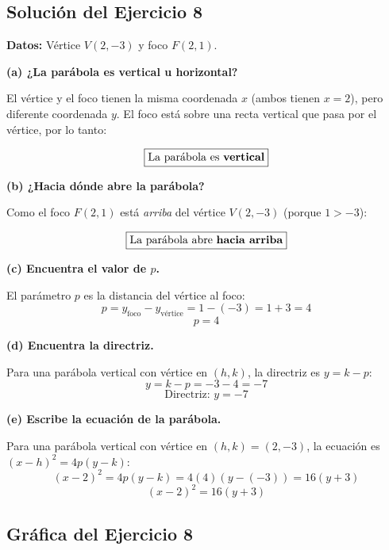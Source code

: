 \documentclass[12pt,a4paper]{article}
\begin{document}
	\newpage

	\subsection*{Solución del Ejercicio 8}

	\textbf{Datos:} Vértice \(V(2,-3)\) y foco \(F(2,1)\).

	\bigskip

	\textbf{(a) ¿La parábola es vertical u horizontal?}

	El vértice y el foco tienen la misma coordenada \(x\) (ambos tienen \(x=2\)), pero diferente coordenada \(y\). El foco está sobre una recta vertical que pasa por el vértice, por lo tanto:

	\[
	\boxed{\text{La parábola es \textbf{vertical}}}
	\]

	\textbf{(b) ¿Hacia dónde abre la parábola?}

	Como el foco \(F(2,1)\) está \emph{arriba} del vértice \(V(2,-3)\) (porque \(1>-3\)):

	\[
	\boxed{\text{La parábola abre \textbf{hacia arriba}}}
	\]

	\textbf{(c) Encuentra el valor de \(p\).}

	El parámetro \(p\) es la distancia del vértice al foco:
	\[
	p = y_{\text{foco}} - y_{\text{vértice}} = 1-(-3)=1+3=4
	\]
	\[
	\boxed{p=4}
	\]

	\textbf{(d) Encuentra la directriz.}

	Para una parábola vertical con vértice en \((h,k)\), la directriz es \(y=k-p\):
	\[
	y=k-p=-3-4=-7
	\]
	\[
	\boxed{\text{Directriz: } y=-7}
	\]

	\textbf{(e) Escribe la ecuación de la parábola.}

	Para una parábola vertical con vértice en \((h,k)=(2,-3)\), la ecuación es \((x-h)^2=4p(y-k)\):
	\[
	(x-2)^2=4p(y-k)=4(4)(y-(-3))=16(y+3)
	\]
	\[
	\boxed{(x-2)^2=16(y+3)}
	\]

	\subsection*{Gráfica del Ejercicio 8}
\end{document}
